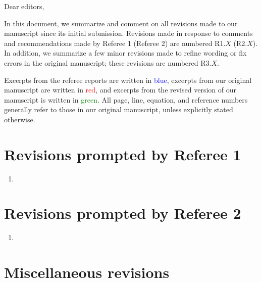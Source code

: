 \documentclass[preprint]{revtex4-1}
\newcommand{\1}{\mathds{1}}
\newcommand{\blue}[1]{\textcolor{blue}{#1}}
\newcommand{\red}[1]{\textcolor{red}{#1}}
\newcommand{\green}[1]{\textcolor{green}{#1}}
\begin{document}
Dear editors,

In this document, we summarize and comment on all revisions made to
our manuscript since its initial submission.  Revisions made in
response to comments and recommendations made by Referee 1 (Referee 2)
are numbered R1.$X$ (R2.$X$).  In addition, we summarize a few minor
revisions made to refine wording or fix errors in the original
manuscript; these revisions are numbered R3.$X$.

Excerpts from the referee reports are written in \blue{blue}, excerpts
from our original manuscript are written in \red{red}, and excerpts
from the revised version of our manuscript is written in
\green{green}.  All page, line, equation, and reference numbers
generally refer to those in our original manuscript, unless explicitly
stated otherwise.


\section*{Revisions prompted by Referee 1}

\begin{enumerate}[label=(R1.\arabic*)]
\item
\end{enumerate}


\section*{Revisions prompted by Referee 2}

\begin{enumerate}[label=(R2.\arabic*)]
\item
\end{enumerate}


\section*{Miscellaneous revisions}
\end{document}
